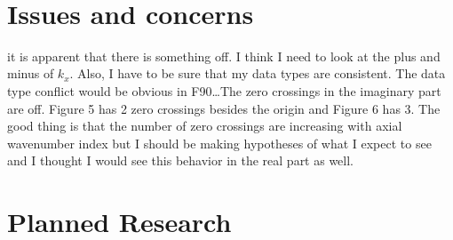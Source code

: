 \documentclass[a4paper]{article}
\begin{document}
\begin{tiny}
 \begin{verbatim}
     
 \end{verbatim}
\end{tiny}
\section{Issues and concerns}
it is apparent that there is something off. I think I need to look at the plus and minus 
of $k_x$. Also, I have to be sure that my data types are consistent. The data type
conflict would be obvious in F90\dots The zero crossings in the imaginary part are off.
Figure 5 has 2 zero crossings besides the origin and Figure 6 has 3. The good thing
is that the number of zero crossings are increasing with axial wavenumber index
but I should be making hypotheses of what I expect to see and I thought I would 
see this behavior in the real part as well. 

\section{Planned Research}
\end{document}
